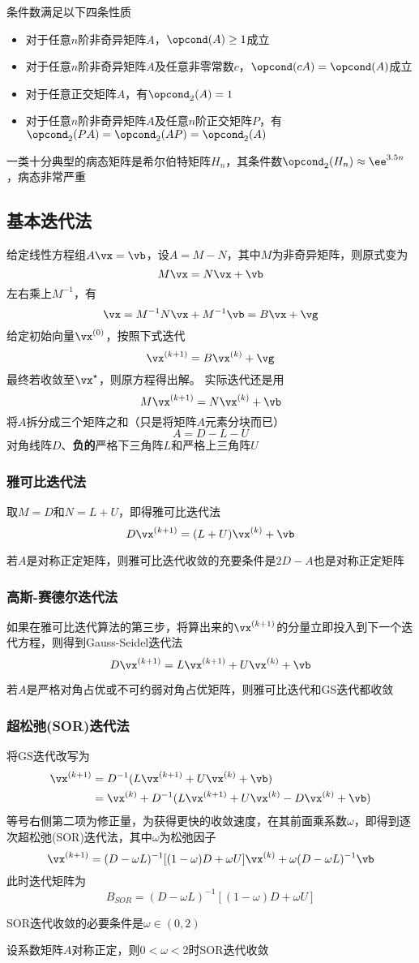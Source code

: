 条件数满足以下四条性质
\begin{itemize}
    \item 对于任意$n$阶非奇异矩阵$A$，$\opcond(A)\geq 1$成立
    \item 对于任意$n$阶非奇异矩阵$A$及任意非零常数$c$，$\opcond(cA)=\opcond(A)$成立
    \item 对于任意正交矩阵$A$，有$\opcond_2(A)=1$
    \item 对于任意$n$阶非奇异矩阵$A$及任意$n$阶正交矩阵$P$，有$\opcond_2(PA)=\opcond_2(AP)=\opcond_2(A)$
\end{itemize}

一类十分典型的病态矩阵是希尔伯特矩阵$H_n$，其条件数$\opcond_2(H_n)\approx\ee^{3.5n}$，病态非常严重

\subsection{基本迭代法}
给定线性方程组$A\vx=\vb$，设$A=M-N$，其中$M$为非奇异矩阵，则原式变为
\[M\vx=N\vx+\vb\]
左右乘上$M^{-1}$，有
\[\vx=M^{-1}N\vx+M^{-1}\vb=B\vx+\vg\]
给定初始向量$\vx^{(0)}$，按照下式迭代
\[\vx^{(k+1)}=B\vx^{(k)}+\vg\]
最终若收敛至$\vx^\star$，则原方程得出解。
实际迭代还是用
\[M\vx^{(k+1)}=N\vx^{(k)}+\vb\]
将$A$拆分成三个矩阵之和（只是将矩阵$A$元素分块而已）
\[A=D-L-U\]
对角线阵$D$、\textbf{负的}严格下三角阵$L$和严格上三角阵$U$

\subsubsection{雅可比迭代法}
取$M=D$和$N=L+U$，即得雅可比迭代法
\[D\vx^{(k+1)}=(L+U)\vx^{(k)}+\vb\]

\begin{theorem}
    若$A$是对称正定矩阵，则雅可比迭代收敛的充要条件是$2D-A$也是对称正定矩阵
\end{theorem}

\subsubsection{高斯-赛德尔迭代法}
如果在雅可比迭代算法的第三步，将算出来的$\vx^{(k+1)}$的分量立即投入到下一个迭代方程，则得到Gauss-Seidel迭代法
\[D\vx^{(k+1)}=L\vx^{(k+1)}+U\vx^{(k)}+\vb\]

\begin{theorem}
    若$A$是严格对角占优或不可约弱对角占优矩阵，则雅可比迭代和GS迭代都收敛
\end{theorem}

\subsubsection{超松弛(SOR)迭代法}
将GS迭代改写为
\[\begin{aligned}
    \vx^{(k+1)}&=D^{-1}(L\vx^{(k+1)}+U\vx^{(k)}+\vb)\\
    &=\vx^{(k)}+D^{-1}(L\vx^{(k+1)}+U\vx^{(k)}-D\vx^{(k)}+\vb)
\end{aligned}\]
等号右侧第二项为修正量，为获得更快的收敛速度，在其前面乘系数$\omega$，即得到逐次超松弛(SOR)迭代法，其中$\omega$为松弛因子
\[\vx^{(k+1)}=(D-\omega L)^{-1}[(1-\omega)D+\omega U]\vx^{(k)}+\omega(D-\omega L)^{-1}\vb\]
此时迭代矩阵为
\[B_{SOR}=(D-\omega L)^{-1}[(1-\omega)D+\omega U]\]

\begin{theorem}
SOR迭代收敛的必要条件是$\omega\in(0,2)$
\end{theorem}
\begin{theorem}
设系数矩阵$A$对称正定，则$0<\omega<2$时SOR迭代收敛
\end{theorem}